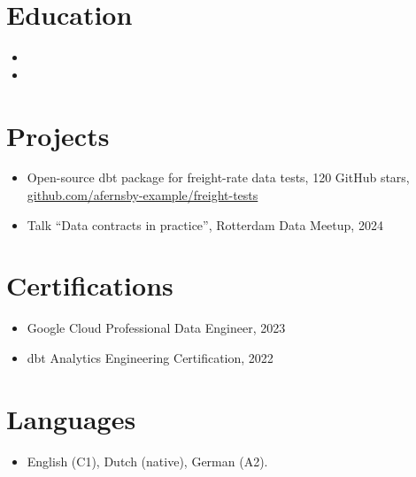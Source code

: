 \documentclass[11pt,a4paper,sans]{moderncv}
\begin{document}
\section{Education}
\vspace{4pt}
\begin{itemize}

\item{}

\vspace{3pt}

\item{}

\end{itemize}

\section{Projects}
\vspace{4pt}
\begin{itemize}
\item {Open-source dbt package for freight-rate data tests, 120 GitHub stars, \href{https://github.com/afernsby-example/freight-tests}{github.com/afernsby-example/freight-tests}}
\item {Talk ``Data contracts in practice'', Rotterdam Data Meetup, 2024}
\end{itemize}

\section{Certifications}
\vspace{4pt}
\begin{itemize}
\item {Google Cloud Professional Data Engineer, 2023}
\item {dbt Analytics Engineering Certification, 2022}
\end{itemize}

\section{Languages}
\vspace{4pt}
\begin{itemize}
\item {English (C1), Dutch (native), German (A2).}
\end{itemize}
\end{document}
